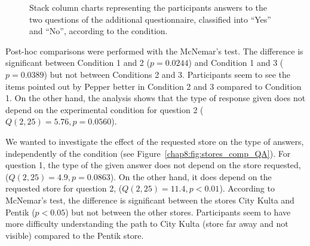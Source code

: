 \documentclass[a4paper,11pt,twoside]{StyleThese}
\begin{document}
\begin{figure}[!htb]
	\centering
	
	\hfill
	\caption{Stack column charts representing the participants answers to the two questions of the additional questionnaire, classified into ``Yes'' and ``No'', according to the condition.}
	\label{chap8:fig:answer_QA}
\end{figure} 


Post-hoc comparisons were performed with the McNemar's test. The difference is significant between Condition 1 and 2 ($p=0.0244$) and Condition 1 and 3 ($p=0.0389$) but not between Conditions 2 and 3. Participants seem to see the items pointed out by Pepper better in Condition 2 and 3 compared to Condition 1. On the other hand, the analysis shows that the type of response given does not depend on the experimental condition for question 2 ($Q(2,25)=5.76, p=0.0560$).

We wanted to investigate the effect of the requested store on the type of answers, independently of the condition (see Figure~\ref{chap8:fig:stores_comp_QA}). For question 1, the type of the given answer does not depend on the store requested, ($Q(2,25)=4.9, p=0.0863$). On the other hand, it does depend on the requested store for question 2, ($Q(2,25)=11.4, p<0.01$). According to McNemar's test, the difference is significant between the stores City Kulta and Pentik ($p<0.05$) but not between the other stores. Participants seem to have more difficulty understanding the path to City Kulta (store far away and not visible) compared to the Pentik store.
\end{document}
